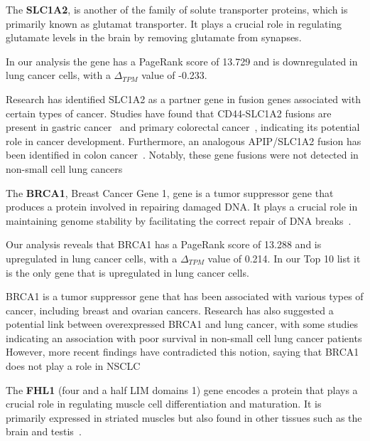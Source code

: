 The \textbf{SLC1A2}, is another of the family of solute transporter proteins, which is primarily known as glutamat transporter.
It plays a crucial role in regulating glutamate levels in the brain by removing glutamate from synapses.\cite{NCBI2017SLC1A2}

In our analysis the gene has a PageRank score of 13.729 and is downregulated in lung cancer cells,
with a $\Delta_{TPM}$ value of -0.233.

Research has identified SLC1A2 as a partner gene in fusion genes associated with certain types of cancer.
Studies have found that CD44-SLC1A2 fusions are present in gastric cancer~\cite{Tao2011CD44} and
primary colorectal cancer~\cite{Shinmura2015CD44}, indicating its potential role in cancer development.
Furthermore, an analogous APIP/SLC1A2 fusion has been identified in colon cancer~\cite{Giacomini2013Breakpoint}.
Notably, these gene fusions were not detected in non-small cell lung cancers~\cite{Shinmura2015CD44}
\newline

The \textbf{BRCA1}, Breast Cancer Gene 1, gene is a tumor suppressor gene that produces a protein involved in repairing damaged DNA\@.
It plays a crucial role in maintaining genome stability by facilitating the correct repair of DNA breaks~\cite{NCI2020BRCA1}.

Our analysis reveals that BRCA1 has a PageRank score of 13.288 and is upregulated in lung cancer cells,
with a $\Delta_{TPM}$ value of 0.214.
In our Top 10 list it is the only gene that is upregulated in lung cancer cells.

BRCA1 is a tumor suppressor gene that has been associated with various types of cancer,
including breast and ovarian cancers\cite{Lee2020BRCA1}.
Research has also suggested a potential link between overexpressed BRCA1 and lung cancer,
with some studies indicating an association with poor survival in non-small cell lung cancer patients\cite{Rosell2007BRCA1}
However, more recent findings have contradicted this notion,
saying that BRCA1 does not play a role in NSCLC~\cite{Gachechiladze2012BRCA1,Lee2020BRCA1}
\newline

The \textbf{FHL1} (four and a half LIM domains 1) gene encodes a protein
that plays a crucial role in regulating muscle cell differentiation and maturation.
It is primarily expressed in striated muscles but also found in other tissues such as the brain and testis~\cite{Storey2020FHL1}.

